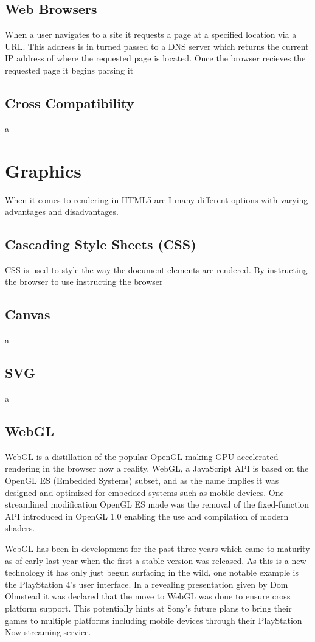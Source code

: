 \documentclass[final]{cmpreport}
\begin{document}
\subsection{Web Browsers}
When a user navigates to a site it requests a page at a specified location via a URL. This address is in turned passed to a DNS server which returns the current IP address of where the requested page is located. Once the browser recieves the requested page it begins parsing it

\subsection{Cross Compatibility}
a

\section{Graphics}
When it comes to rendering in HTML5 are I many different options with varying advantages and disadvantages.

\subsection{Cascading Style Sheets (CSS)}
CSS is used to style the way the document elements are rendered. By instructing the browser to use  instructing the browser

\subsection{Canvas}
a

\subsection{SVG}
a

\subsection{WebGL}
WebGL is a distillation of the popular OpenGL making GPU accelerated rendering in the browser now a reality. WebGL, a JavaScript API is based on the OpenGL ES (Embedded Systems) subset, and as the name implies it was designed and optimized for embedded systems such as mobile devices. One streamlined modification OpenGL ES made was the removal of the fixed-function API introduced in OpenGL 1.0 enabling the use and compilation of modern shaders.

WebGL has been in development for the past three years which came to maturity as of early last year when the first a stable version was released. As this is a new technology it has only just begun surfacing in the wild, one notable example is the PlayStation 4's user interface. In a revealing presentation given by Dom Olmstead it was declared that the move to WebGL was done to ensure cross platform support. This potentially hints at Sony's future plans to bring their games to multiple platforms including mobile devices through their PlayStation Now streaming service.
\end{document}
